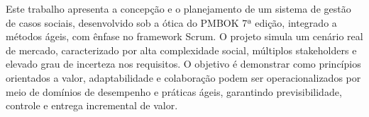 \begin{resumo}
Este trabalho apresenta a concepção e o planejamento de um sistema de gestão de casos sociais, desenvolvido sob a ótica do PMBOK 7ª edição, integrado a métodos ágeis, com ênfase no framework Scrum. O projeto simula um cenário real de mercado, caracterizado por alta complexidade social, múltiplos stakeholders e elevado grau de incerteza nos requisitos. O objetivo é demonstrar como princípios orientados a valor, adaptabilidade e colaboração podem ser operacionalizados por meio de domínios de desempenho e práticas ágeis, garantindo previsibilidade, controle e entrega incremental de valor.
\end{resumo}

\begin{abstract}
This work presents the conception and planning of a social case management system, developed from the perspective of the PMBOK 7th edition, integrated with agile methods, with emphasis on the Scrum framework. The project simulates a real market scenario, characterized by high social complexity, multiple stakeholders, and a high degree of uncertainty in requirements. The objective is to demonstrate how value-oriented principles, adaptability, and collaboration can be operationalized through performance domains and agile practices, ensuring predictability, control, and incremental delivery of value.
\end{abstract}


